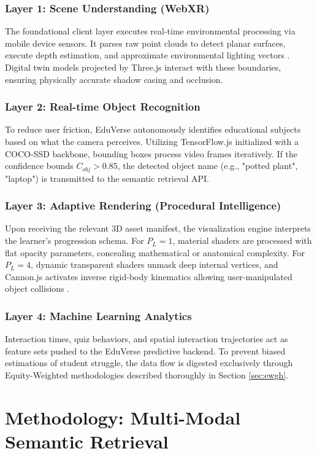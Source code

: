 \documentclass[conference]{IEEEtran}
\begin{document}
\subsubsection{Layer 1: Scene Understanding (WebXR)}
The foundational client layer executes real-time environmental processing via mobile device sensors. It parses raw point clouds to detect planar surfaces, execute depth estimation, and approximate environmental lighting vectors \cite{white2024rendering}. Digital twin models projected by Three.js interact with these boundaries, ensuring physically accurate shadow casing and occlusion.

\subsubsection{Layer 2: Real-time Object Recognition}
To reduce user friction, EduVerse autonomously identifies educational subjects based on what the camera perceives. Utilizing TensorFlow.js initialized with a COCO-SSD backbone, bounding boxes process video frames iteratively. If the confidence bounds $C_{obj} > 0.85$, the detected object name (e.g., "potted plant", "laptop") is transmitted to the semantic retrieval API.

\subsubsection{Layer 3: Adaptive Rendering (Procedural Intelligence)}
Upon receiving the relevant 3D asset manifest, the visualization engine interprets the learner's progression schema. For $P_L = 1$, material shaders are processed with flat opacity parameters, concealing mathematical or anatomical complexity. For $P_L = 4$, dynamic transparent shaders unmask deep internal vertices, and Cannon.js activates inverse rigid-body kinematics allowing user-manipulated object collisions \cite{evans2023physics}.

\subsubsection{Layer 4: Machine Learning Analytics}
Interaction times, quiz behaviors, and spatial interaction trajectories act as feature sets pushed to the EduVerse predictive backend. To prevent biased estimations of student struggle, the data flow is digested exclusively through Equity-Weighted methodologies described thoroughly in Section \ref{sec:ewgh}.

\section{Methodology: Multi-Modal Semantic Retrieval}
\end{document}
